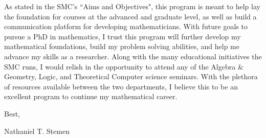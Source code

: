 \documentclass[11pt]{article}
\begin{document}
As stated in the SMC's ``Aims and Objectives", this program is meant to help lay the foundation for courses at the advanced and graduate level, as well as build a communication platform for developing mathematicians. With future goals to pursue a PhD in mathematics, I trust this program will further develop my mathematical foundations, build my problem solving abilities, and help me advance my skills as a researcher. Along with the many educational initiatives the SMC runs, I would relish in the opportunity to attend any of the Algebra \& Geometry, Logic, and Theoretical Computer science seminars. With the plethora of resources available between the two departments, I believe this to be an excellent program to continue my mathematical career.

\noindent
Best,

Nathaniel T. Stemen
\end{document}
